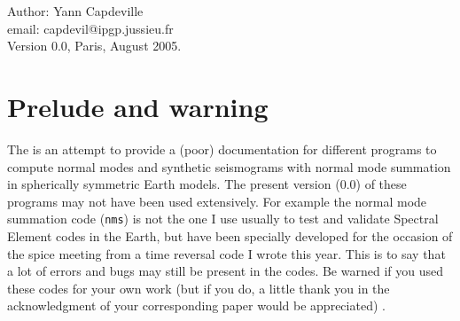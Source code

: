 \documentclass[11pt]{article}
\begin{document}
Author: Yann Capdeville\\
email: capdevil@ipgp.jussieu.fr\\
Version 0.0, Paris, August 2005.
\section{Prelude and warning}
The is an attempt to provide a (poor) documentation for 
different programs to compute normal modes and synthetic
seismograms with normal mode summation in spherically symmetric Earth models.
The present version (0.0) of these programs may  not have been used
extensively. For example the normal mode summation code ({\tt nms})
is not the one I use usually to test and validate Spectral Element
codes in the Earth, but have been specially developed for the occasion of the
spice meeting from a time reversal code I wrote this year. This is to
say that a lot of errors and bugs may still be present in the codes. 
Be warned if you used these codes for your own work (but if you do, a
little thank you in the acknowledgment of your corresponding paper
would be appreciated) . 
\end{document}
